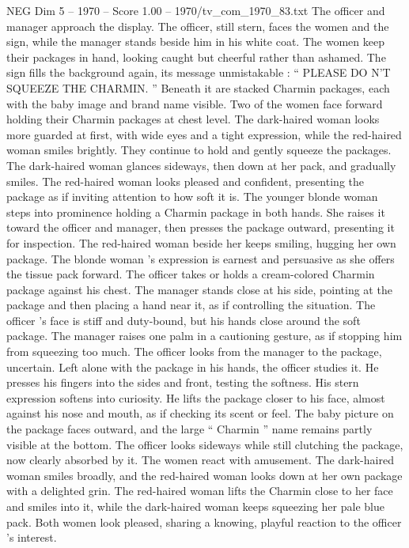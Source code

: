 \begin{textsample}{NEG Dim 5 – 1970 – Score 1.00 – 1970/tv\_com\_1970\_83.txt}
The officer and manager approach the display.
The officer, still stern, faces the women and the sign, while the manager stands beside him in his white coat.
The women keep their packages in hand, looking caught but cheerful rather than ashamed.
The sign fills the background again, its message unmistakable : “ PLEASE DO N’T SQUEEZE THE CHARMIN. ” Beneath it are stacked Charmin packages, each with the baby image and brand name visible.
Two of the women face forward holding their Charmin packages at chest level.
The dark-haired woman looks more guarded at first, with wide eyes and a tight expression, while the red-haired woman smiles brightly.
They continue to hold and gently squeeze the packages.
The dark-haired woman glances sideways, then down at her pack, and gradually smiles.
The red-haired woman looks pleased and confident, presenting the package as if inviting attention to how soft it is.
The younger blonde woman steps into prominence holding a Charmin package in both hands.
She raises it toward the officer and manager, then presses the package outward, presenting it for inspection.
The red-haired woman beside her keeps smiling, hugging her own package.
The blonde woman ’s expression is earnest and persuasive as she offers the tissue pack forward.
The officer takes or holds a cream-colored Charmin package against his chest.
The manager stands close at his side, pointing at the package and then placing a hand near it, as if controlling the situation.
The officer ’s face is stiff and duty-bound, but his hands close around the soft package.
The manager raises one palm in a cautioning gesture, as if stopping him from squeezing too much.
The officer looks from the manager to the package, uncertain.
Left alone with the package in his hands, the officer studies it.
He presses his fingers into the sides and front, testing the softness.
His stern expression softens into curiosity.
He lifts the package closer to his face, almost against his nose and mouth, as if checking its scent or feel.
The baby picture on the package faces outward, and the large “ Charmin ” name remains partly visible at the bottom.
The officer looks sideways while still clutching the package, now clearly absorbed by it.
The women react with amusement.
The dark-haired woman smiles broadly, and the red-haired woman looks down at her own package with a delighted grin.
The red-haired woman lifts the Charmin close to her face and smiles into it, while the dark-haired woman keeps squeezing her pale blue pack.
Both women look pleased, sharing a knowing, playful reaction to the officer ’s interest.

\end{textsample}
